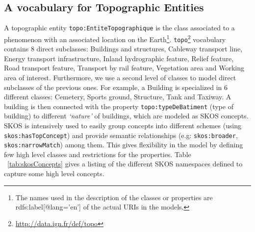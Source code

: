\subsection{A vocabulary for Topographic Entities}
\label{sec:topovocab}

A topographic entity \texttt{topo:EntiteTopographique} is the class associated to a phenomenon with an associated location on the Earth\footnote{The names used in the description of the classes or properties are rdfs:label[@lang='en'] of the actual URIs in the models.}. \texttt{topo}\footnote{\url{http://data.ign.fr/def/topo}} vocabulary contains $8$ direct subclasses: Buildings and structures, Cableway transport line, Energy transport infrastructure, Inland hydrographic feature, Relief feature, Road transport feature, Transport by rail feature, Vegetation area and Working area of interest. Furthermore, we use a second level of classes to model direct subclasses of the previous ones. For example, a Building is specialized in $6$ different classes: Cemetery, Sports ground, Structure, Tank and Taxiway. A building is then connected with the property \texttt{topo:typeDeBatiment} (type of building) to different \textit{`nature'} of buildings, which are modeled as SKOS concepts. SKOS is intensively used to easily group concepts into different schemes (using \texttt{skos:hasTopConcept}) and provide semantic relationships (e.g: \texttt{skos:broader}, \texttt{skos:narrowMatch}) among them. This gives flexibility in the model by defining few high level classes and restrictions for the properties. Table ~\ref{tab:skosConcepts} gives a listing of the different SKOS namespaces defined to capture some high level concepts.

